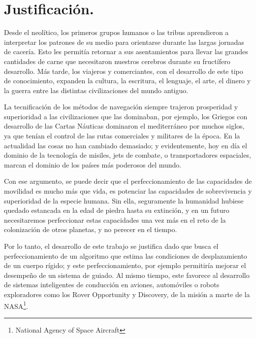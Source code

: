\documentclass[10pt]{report}
\numberwithin{equation}{chapter}
\numberwithin{algorithm}{chapter}
\begin{document}
\section{Justificación.}
Desde el neolítico, los primeros grupos humanos o las tribus aprendieron a interpretar los patrones de su medio para orientarse durante las largas jornadas de cacería. Esto les permitía retornar a sus asentamientos para llevar las grandes cantidades de carne que necesitaron nuestros cerebros durante su fructífero desarrollo. Más tarde, los viajeros y comerciantes, con el desarrollo de este tipo de conocimiento, expanden la cultura, la escritura, el lenguaje, el arte, el dinero y la guerra entre las distintas civilizaciones del mundo antiguo.\par
La tecnificación de los métodos de navegación siempre trajeron prosperidad y superioridad a las civilizaciones que las dominaban, por ejemplo, los Griegos con desarrollo de las Cartas Náuticas dominaron el mediterráneo por muchos siglos, ya que tenían el control de las rutas comerciales y militares de la época. En la actualidad las cosas no han cambiado demasiado; y evidentemente, hoy en día el dominio de la tecnología de misiles, jets de combate, o transportadores espaciales, marcan el dominio de los países más poderosos del mundo.\par
Con ese argumento, se puede decir que el perfeccionamiento de las capacidades de movilidad es mucho más que vida, es potenciar las capacidades de sobrevivencia y superioridad de la especie humana. Sin ella, seguramente la humanidad hubiese quedado estancada en la edad de piedra hasta su extinción, y en un futuro necesitaremos perfeccionar estas capacidades una vez más en el reto de la colonización de otros planetas, y no perecer en el tiempo.\par
Por lo tanto, el desarrollo de este trabajo se justifica dado que busca el perfeccionamiento de un algoritmo que estima las condiciones de desplazamiento de un cuerpo rígido; y este perfeccionamiento, por ejemplo permitiría mejorar el desempeño de un sistema de guiado. Al mismo tiempo, este favorece al desarrollo de sistemas inteligentes de conducción en aviones, automóviles o robots exploradores como los Rover Opportunity y Discovery, de la misión a marte de la NASA\footnote{National Agency of Space Aircraft}.\par
\end{document}
